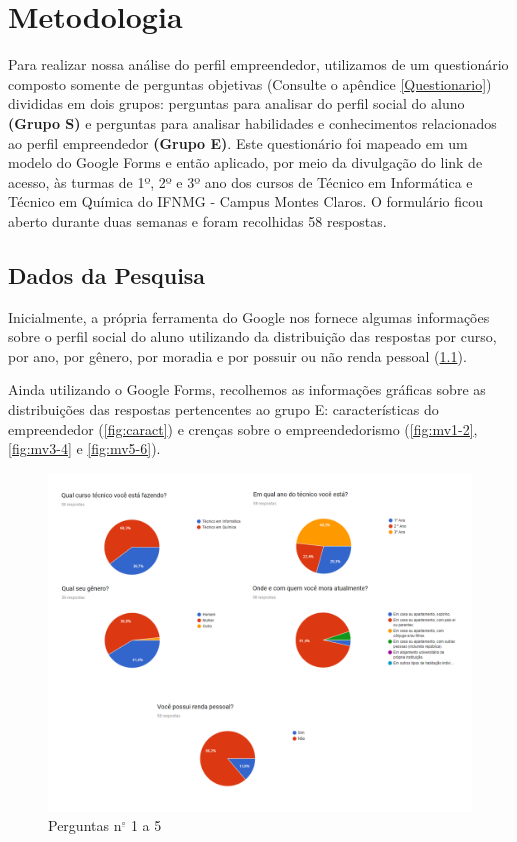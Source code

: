 \chapter{Metodologia}\label{capitulo2}

Para realizar nossa análise do perfil empreendedor, utilizamos de um questionário composto somente de perguntas objetivas (Consulte o apêndice \ref{Questionario}) divididas em dois grupos: perguntas para analisar do perfil social do aluno \textbf{(Grupo S)} e perguntas para analisar habilidades e conhecimentos relacionados ao perfil empreendedor \textbf{(Grupo E)}. Este questionário foi mapeado em um modelo do Google Forms e então aplicado, por meio da divulgação do link de acesso, às turmas de 1º, 2º e 3º ano dos cursos de Técnico em Informática e Técnico em Química do IFNMG - Campus Montes Claros. O formulário ficou aberto durante duas semanas e foram recolhidas 58 respostas.

\section{Dados da Pesquisa}
Inicialmente, a própria ferramenta do Google nos fornece algumas informações sobre o perfil social do aluno utilizando da distribuição das respostas por curso, por ano, por gênero, por moradia e por possuir ou não renda pessoal (\ref{fig:quest1-5}).

Ainda utilizando o Google Forms, recolhemos as informações gráficas sobre as distribuições das respostas pertencentes ao grupo E: características do empreendedor (\ref{fig:caract}) e crenças sobre o empreendedorismo (\ref{fig:mv1-2}, \ref{fig:mv3-4} e \ref{fig:mv5-6}).

\begin{figure}[!htb]
    \centering
    \includegraphics[width=1.0\textwidth]{img/quest1-5.png}
    \caption{Perguntas n$^{\underline{\circ}}$ 1 a 5}
    \label{fig:quest1-5}
\end{figure}

